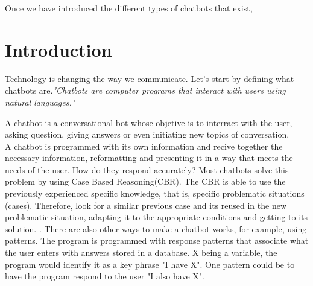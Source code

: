 \documentclass[12pt,twoside]{article}
\theoremstyle{plain}
\theoremstyle{definition}
\theoremstyle{remark}
\begin{document}
Once we have introduced the different types of chatbots that exist, 

\setcounter{tocdepth}{2} 					%
\tableofcontents

\clearpage



\section{Introduction}
\label{sec:introduction}

Technology is changing the way we communicate. Let's start by defining what chatbots are.\textit{"Chatbots are computer programs that interact with users using natural languages."} \cite{shawar2007chatbots}

A chatbot is a conversational bot whose objetive is to interract with the user, asking question, giving answers or even initiating new topics of conversation. \cite{huang2007extracting} \\

A chatbot is programmed with its own information and recive together the necessary information, reformatting and presenting it in a way that meets the needs of the user. How do they respond accurately? Most chatbots solve this problem by using Case Based Reasoning(CBR). The CBR is able to use the previously experienced specific knowledge, that is, specific problematic situations (cases). Therefore, look for a similar previous case and its reused in the new problematic situation, adapting it to the appropriate conditions and getting to its solution. \cite{kolodner2014case}. There are also other ways to make a chatbot works, for example, using patterns. The program is programmed with response patterns that associate what the user enters with answers stored in a database. X being a variable, the program would identify it as a key phrase "I have X". One pattern could be to have the program respond to the user "I also have X". \\
\end{document}

